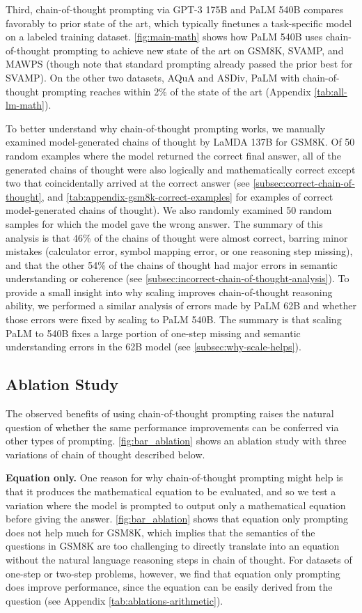 Third, chain-of-thought prompting via GPT-3 175B and PaLM 540B compares favorably to prior state of the art, which typically finetunes a task-specific model on a labeled training dataset. 
\cref{fig:main-math} shows how PaLM 540B uses chain-of-thought prompting to achieve new state of the art on GSM8K, SVAMP, and MAWPS (though note that standard prompting already passed the prior best for SVAMP). On the other two datasets, AQuA and ASDiv, PaLM with chain-of-thought prompting reaches within 2\% of the state of the art (Appendix \cref{tab:all-lm-math}).

To better understand why chain-of-thought prompting works, we manually examined model-generated chains of thought by LaMDA 137B for GSM8K. Of 50 random examples where the model returned the correct final answer, all of the generated chains of thought were also logically and mathematically correct except two that coincidentally arrived at the correct answer (see \cref{subsec:correct-chain-of-thought}, and \cref{tab:appendix-gsm8k-correct-examples} for examples of correct model-generated chains of thought). We also randomly examined 50 random samples for which the model gave the wrong answer. The summary of this analysis is that 46\% of the chains of thought were almost correct, barring minor mistakes (calculator error, symbol mapping error, or one reasoning step missing), and that the other 54\% of the chains of thought had major errors in semantic understanding or coherence (see \cref{subsec:incorrect-chain-of-thought-analysis}). 
To provide a small insight into why scaling improves chain-of-thought reasoning ability, we performed a similar analysis of errors made by PaLM 62B and whether those errors were fixed by scaling to PaLM 540B. The summary is that scaling PaLM to 540B fixes a large portion of one-step missing and semantic understanding errors in the 62B model (see \cref{subsec:why-scale-helps}).

\subsection{Ablation Study}\label{subsec:math-ablation}

The observed benefits of using chain-of-thought prompting raises the natural question of whether the same performance improvements can be conferred via other types of prompting.
\cref{fig:bar_ablation} shows an ablation study with three variations of chain of thought described below.

\textbf{Equation only.} One reason for why chain-of-thought prompting might help is that it produces the mathematical equation to be evaluated, and so we test a variation where the model is prompted to output only a mathematical equation before giving the answer. 
\cref{fig:bar_ablation} shows that equation only prompting does not help much for GSM8K, which implies that the semantics of the questions in GSM8K are too challenging to directly translate into an equation without the natural language reasoning steps in chain of thought. For datasets of one-step or two-step problems, however, we find that equation only prompting does improve performance, since the equation can be easily derived from the question (see Appendix \cref{tab:ablations-arithmetic}). 

